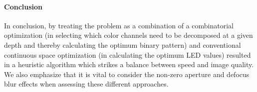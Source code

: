 \paragraph{Conclusion}
In conclusion, by treating the problem as a combination of a combinatorial optimization (in selecting which color channels need to be decomposed at a given depth and thereby calculating the optimum binary pattern) and conventional continuous space optimization (in calculating the optimum LED values) resulted in a heuristic algorithm which strikes a balance between speed and image quality. We also emphasize that it is vital to consider the non-zero aperture and defocus blur effects when assessing these different approaches.

